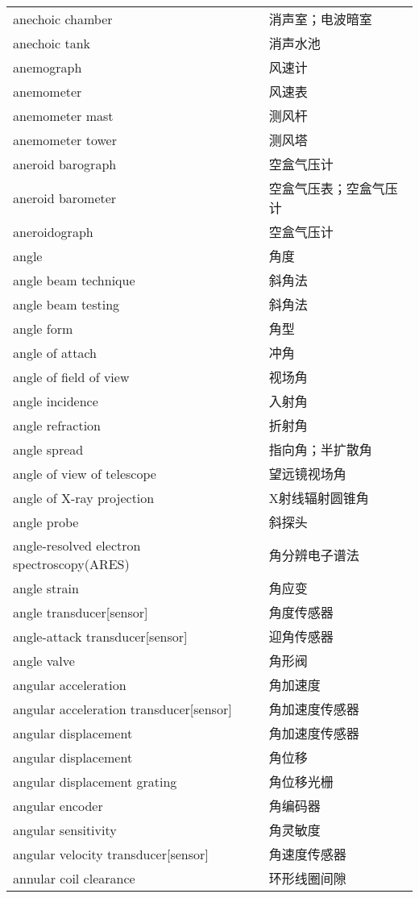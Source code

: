 \documentclass[
]{article}
\begin{document}
\begin{longtable}[]{@{}ll@{}}
anechoic chamber & 消声室；电波暗室 \\
anechoic tank & 消声水池 \\
anemograph & 风速计 \\
anemometer & 风速表 \\
anemometer mast & 测风杆 \\
anemometer tower & 测风塔 \\
aneroid barograph & 空盒气压计 \\
aneroid barometer & 空盒气压表；空盒气压计 \\
aneroidograph & 空盒气压计 \\
angle & 角度 \\
angle beam technique & 斜角法 \\
angle beam testing & 斜角法 \\
angle form & 角型 \\
angle of attach & 冲角 \\
angle of field of view & 视场角 \\
angle incidence & 入射角 \\
angle refraction & 折射角 \\
angle spread & 指向角；半扩散角 \\
angle of view of telescope & 望远镜视场角 \\
angle of X-ray projection & X射线辐射圆锥角 \\
angle probe & 斜探头 \\
angle-resolved electron spectroscopy(ARES) & 角分辨电子谱法 \\
angle strain & 角应变 \\
angle transducer{[}sensor{]} & 角度传感器 \\
angle-attack transducer{[}sensor{]} & 迎角传感器 \\
angle valve & 角形阀 \\
angular acceleration & 角加速度 \\
angular acceleration transducer{[}sensor{]} & 角加速度传感器 \\
angular displacement & 角加速度传感器 \\
angular displacement & 角位移 \\
angular displacement grating & 角位移光栅 \\
angular encoder & 角编码器 \\
angular sensitivity & 角灵敏度 \\
angular velocity transducer{[}sensor{]} & 角速度传感器 \\
annular coil clearance & 环形线圈间隙 \\

\end{longtable}
\end{document}
